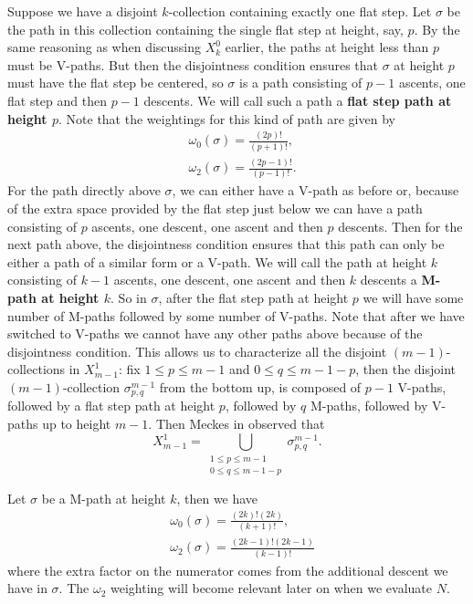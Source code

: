 \documentclass[11pt]{article}
\theoremstyle{mythm}
\begin{document}
Suppose we have a disjoint $k$-collection containing exactly one flat step. Let $\sigma$ be the path in this collection containing the single flat step at height, say, $p$. By the same reasoning as when discussing $X_k^0$ earlier, the paths at height less than $p$ must be V-paths. But then the disjointness condition ensures that $\sigma$ at height $p$ must have the flat step be centered, so $\sigma$ is a path consisting of $p-1$ ascents, one flat step and then $p-1$ descents. We will call such a path a \textbf{flat step path at height $p$}. Note that the weightings for this kind of path are given by
\begin{align*}
&\omega_0(\sigma) = \frac{(2p)!}{(p+1)!}, \\
&\omega_2(\sigma) = \frac{(2p-1)!}{(p-1)!}.
\end{align*}
For the path directly above $\sigma$, we can either have a V-path as before or, because of the extra space provided by the flat step just below we can have a path consisting of $p$ ascents, one descent, one ascent and then $p$ descents. Then for the next path above, the disjointness condition ensures that this path can only be either a path of a similar form or a V-path. We will call the path at height $k$ consisting of $k-1$ ascents, one descent, one ascent and then $k$ descents a \textbf{M-path at height $k$}. So in $\sigma$, after the flat step path at height $p$ we will have some number of M-paths followed by some number of V-paths. Note that after we have switched to V-paths we cannot have any other paths above because of the disjointness condition. This allows us to characterize all the disjoint $(m-1)$-collections in $X_{m-1}^1$: fix $1\leq p\leq m-1$ and $0\leq q \leq m-1-p$, then the disjoint $(m-1)$-collection $\sigma_{p,q}^{m-1}$ from the bottom up, is composed of $p-1$ V-paths, followed by a flat step path at height $p$, followed by $q$ M-paths, followed by V-paths up to height $m-1$. Then Meckes in \cite{meckes_magnitude_2019} observed that
\begin{equation*}
X_{m-1}^1 = \bigcup\limits_{\substack{1\leq p \leq m-1 \\ 0\leq q \leq m-1-p}} \sigma_{p,q}^{m-1}.
\end{equation*}

Let $\sigma$ be a M-path at height $k$, then we have
\begin{align*}
&\omega_0(\sigma) = \frac{(2k)!(2k)}{(k+1)!}, \\
&\omega_2(\sigma) = \frac{(2k-1)!(2k-1)}{(k-1)!}
\end{align*}
where the extra factor on the numerator comes from the additional descent we have in $\sigma$. The $\omega_2$ weighting will become relevant later on when we evaluate $N$.
\end{document}
